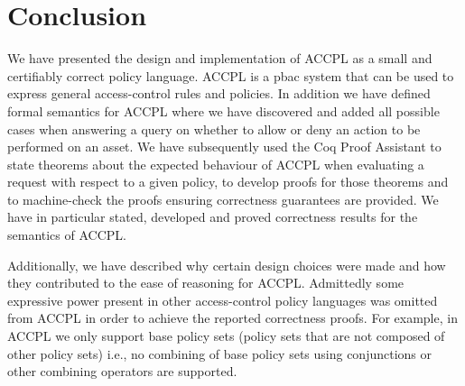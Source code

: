 \documentclass[runningheads,a4paper]{llncs}
\newcommand{\commentatside}[1]{\pdfcomment[color={0.045 0.278 0.643},icon=Note]{#1}}
\newcommand{\todo}[1]{\commentatside{#1}}
\begin{document}


%
%

%
%
%
%
%
%
%

\section{Conclusion}
We have presented the design and implementation of \ac{ACCPL} as a small and certifiably correct policy language. \ac{ACCPL} is a \ac{pbac} system that can be used to express general access-control rules and policies. In addition we have defined formal semantics for \ac{ACCPL} where we have discovered and added all possible cases when answering a query on whether to allow or deny an action to be performed on an asset. We have subsequently used the Coq Proof Assistant to state theorems about the expected behaviour of \ac{ACCPL} when evaluating a request with respect to a given policy, to develop proofs for those theorems and to machine-check the proofs ensuring correctness guarantees are provided. We have in particular stated, developed and proved correctness results for the semantics of \ac{ACCPL}. 

Additionally, we have described why certain design choices were made and how they contributed to the ease of reasoning for \ac{ACCPL}. Admittedly some expressive power present in other access-control policy languages was omitted from \ac{ACCPL} in order to achieve the reported correctness proofs. For example, in \ac{ACCPL} we only support base policy sets (policy sets that are not composed of other policy sets) i.e., no combining of base policy sets using conjunctions or other combining operators are supported. 
\end{document}
